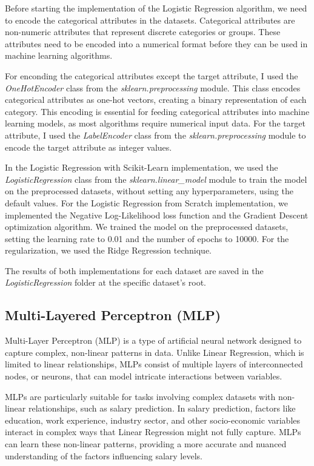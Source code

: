 \documentclass[runningheads]{paper}
\begin{document}
Before starting the implementation of the Logistic Regression algorithm, we need to
encode the categorical attributes in the datasets. Categorical attributes are non-numeric
attributes that represent discrete categories or groups. These attributes need to be
encoded into a numerical format before they can be used in machine learning algorithms.

For enconding the categorical attributes except the target attribute, I used the
\textit{OneHotEncoder} class from the \textit{sklearn.preprocessing} module. This
class encodes categorical attributes as one-hot vectors, creating a binary representation
of each category. This encoding is essential for feeding categorical attributes into
machine learning models, as most algorithms require numerical input data. For the
target attribute, I used the \textit{LabelEncoder} class from the \textit{sklearn.preprocessing}
module to encode the target attribute as integer values.

In the Logistic Regression with Scikit-Learn implementation, we used the \textit{LogisticRegression}
class from the \textit{sklearn.linear\_model} module to train the model on the preprocessed
datasets, without setting any hyperparameters, using the default values.
For the Logistic Regression from Scratch implementation, we implemented the Negative Log-Likelihood
loss function and the Gradient Descent optimization algorithm. We trained the model on the
preprocessed datasets, setting the learning rate to 0.01 and the number of epochs to 10000. For the
regularization, we used the Ridge Regression technique.

The results of both implementations for each dataset are saved in the \textit{LogisticRegression}
folder at the specific dataset's root.

\subsection{Multi-Layered Perceptron (MLP)}
Multi-Layer Perceptron (MLP) is a type of artificial neural network designed to 
capture complex, non-linear patterns in data. Unlike Linear Regression, which is
limited to linear relationships, MLPs consist of multiple layers of interconnected 
nodes, or neurons, that can model intricate interactions between variables.

MLPs are particularly suitable for tasks involving complex datasets with 
non-linear relationships, such as salary prediction. In salary prediction, 
factors like education, work experience, industry sector, and other 
socio-economic variables interact in complex ways that Linear Regression might 
not fully capture. MLPs can learn these non-linear patterns, providing a more 
accurate and nuanced understanding of the factors influencing salary levels.
\end{document}
